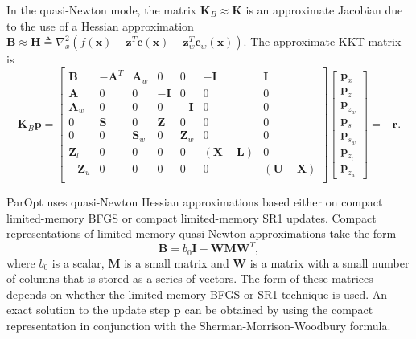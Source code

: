 \documentclass[12pt]{article}
\newcommand{\mb}{\mathbf}
\begin{document}
In the quasi-Newton mode, the matrix $\mb{K}_{B} \approx \mb{K}$ is an approximate Jacobian due to the use of a Hessian approximation $\mb{B} \approx \mb{H} \triangleq \nabla_{x}^{2} \left(f(\mb{x}) - \mb{z}^{T}\mb{c}(\mb{x}) - \mb{z}_{w}^{T}\mb{c}_{w}(\mb{x}) \right)$.
The approximate KKT matrix is
%
\begin{equation}
  \label{eqn:kkt-update}
  \mb{K}_{B}\mb{p} =
  \begin{bmatrix}
    \mb{B}    & -\mb{A}^{T} & \mb{A}_{w} &       0 &      0 & -\mb{I} & \mb{I} \\
    \mb{A}    &           0 &         0 & -\mb{I} &      0 &       0 & 0 \\
    \mb{A}_{w} &           0 &         0 &      0 & -\mb{I} &       0 & 0 \\
    0 &               \mb{S} &        0 & \mb{Z} &       0 &       0 & 0 \\
    0 &                    0 & \mb{S}_{w} &      0 & \mb{Z}_{w} &  0 & 0 \\
    \mb{Z}_{l} &           0 &          0 &      0 & 0 & (\mb{X} - \mb{L}) & 0 \\
    -\mb{Z}_{u} &          0 &          0 &      0 & 0 & 0 & (\mb{U} - \mb{X}) \\
  \end{bmatrix}
  \begin{bmatrix}
    \mb{p}_{x} \\
    \mb{p}_{z} \\
    \mb{p}_{z_{w}} \\
    \mb{p}_{s} \\
    \mb{p}_{s_{w}} \\
    \mb{p}_{z_{l}} \\
    \mb{p}_{z_{u}}
  \end{bmatrix} = -\mb{r}.
\end{equation}

ParOpt uses quasi-Newton Hessian approximations based either on compact limited-memory BFGS or compact limited-memory SR1 updates. 
Compact representations of limited-memory quasi-Newton approximations take the form
%
\begin{equation*}
  \mb{B} = b_0\mb{I} - \mb{W}\mb{M}\mb{W}^{T},
\end{equation*}
where $b_0$ is a scalar, $\mb{M}$ is a small matrix and $\mb{W}$ is a matrix with a small number of columns that is stored as a series of vectors.
The form of these matrices depends on whether the limited-memory BFGS or SR1 technique is used. 
An exact solution to the update step $\mb{p}$ can be obtained by using the compact representation in conjunction with the Sherman-Morrison-Woodbury formula.
\end{document}
